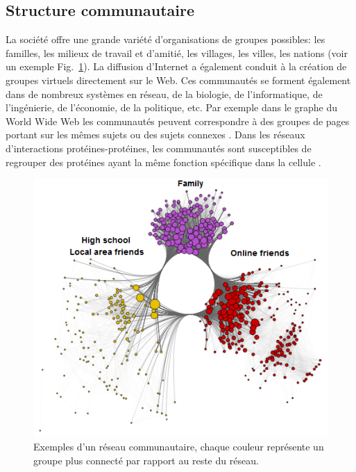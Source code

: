 \subsection{Structure communautaire}
La société offre une grande variété d'organisations de groupes possibles: les familles, les milieux de travail et d'amitié, les villages, les villes, les nations (voir un exemple Fig.~\ref{community-network}). La diffusion d'Internet a également conduit à la création de groupes virtuels directement sur le Web. Ces communautés se forment également dans de nombreux systèmes en réseau, de la biologie, de l'informatique, de l'ingénierie, de l'économie, de la politique, etc. Par exemple dans le graphe du World Wide Web les communautés peuvent correspondre à des groupes de pages portant sur les mêmes sujets ou des sujets connexes \cite{Dou-al2007,Flak-al2002}. Dans les réseaux d'interactions protéines-protéines, les communautés sont susceptibles de regrouper des protéines ayant la même fonction spécifique dans la cellule \cite{ChY2006,RivT2003}.\\

\begin{figure}[h!]
	\centering
	\includegraphics[scale=0.55]{./figures/community-network}
	\caption{Exemples d'un réseau communautaire, chaque couleur représente un groupe plus connecté par rapport au reste du réseau.}
	\label{community-network}
\end{figure}

